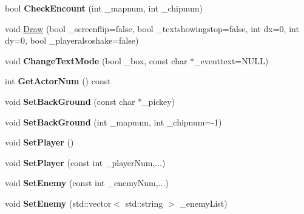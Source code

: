 \begin{DoxyCompactItemize}
\item 
bool {\bfseries Check\+Encount} (int \+\_\+mapnum, int \+\_\+chipnum)\hypertarget{class_c_battle_a3af6b934068757e5eb62ef786360dd2c}{}\label{class_c_battle_a3af6b934068757e5eb62ef786360dd2c}

\item 
void \hyperlink{class_c_battle_ac416d83a1e6f4d2ff8c744023869c054}{Draw} (bool \+\_\+screenflip=false, bool \+\_\+textshowingstop=false, int dx=0, int dy=0, bool \+\_\+playeralsoshake=false)
\item 
void {\bfseries Change\+Text\+Mode} (bool \+\_\+box, const char $\ast$\+\_\+eventtext=N\+U\+LL)\hypertarget{class_c_battle_a6adcdc1aa707eb768aa311a784c98a98}{}\label{class_c_battle_a6adcdc1aa707eb768aa311a784c98a98}

\item 
int {\bfseries Get\+Actor\+Num} () const \hypertarget{class_c_battle_a34bde26f083675ba06d8793b1af01df2}{}\label{class_c_battle_a34bde26f083675ba06d8793b1af01df2}

\item 
void {\bfseries Set\+Back\+Ground} (const char $\ast$\+\_\+pickey)\hypertarget{class_c_battle_a6239d9c48096fe2487f0ff1c68d11062}{}\label{class_c_battle_a6239d9c48096fe2487f0ff1c68d11062}

\item 
void {\bfseries Set\+Back\+Ground} (int \+\_\+mapnum, int \+\_\+chipnum=-\/1)\hypertarget{class_c_battle_a8a885868777f55a0124e9463f83f8ea0}{}\label{class_c_battle_a8a885868777f55a0124e9463f83f8ea0}

\item 
void {\bfseries Set\+Player} ()\hypertarget{class_c_battle_a87d5e5b1da16875838881dcd04f04fa1}{}\label{class_c_battle_a87d5e5b1da16875838881dcd04f04fa1}

\item 
void {\bfseries Set\+Player} (const int \+\_\+player\+Num,...)\hypertarget{class_c_battle_a240dec65cd7817f3e012a27d62bd952d}{}\label{class_c_battle_a240dec65cd7817f3e012a27d62bd952d}

\item 
void {\bfseries Set\+Enemy} (const int \+\_\+enemy\+Num,...)\hypertarget{class_c_battle_ab566ace6e3e4e3a3d2312642d44e0459}{}\label{class_c_battle_ab566ace6e3e4e3a3d2312642d44e0459}

\item 
void {\bfseries Set\+Enemy} (std\+::vector$<$ std\+::string $>$ \+\_\+enemy\+List)\hypertarget{class_c_battle_a8275dbc7c3f8b8f12ab51ef97efd8960}{}\label{class_c_battle_a8275dbc7c3f8b8f12ab51ef97efd8960}


\end{DoxyCompactItemize}
